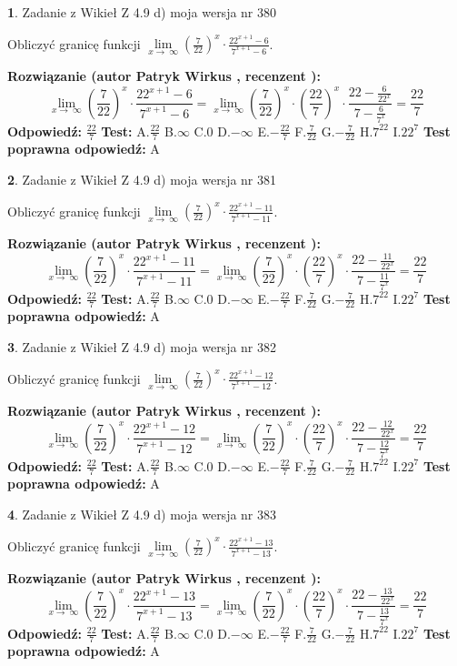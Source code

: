 \documentclass[12pt, a4paper]{article}
\theoremstyle{definition} %
\newtheorem{zad}{}
\newcommand{\zadStart}[1]{\begin{zad}#1\newline}
\newcommand{\zadStop}{\end{zad}}
\newcommand{\rozwStart}[2]{\noindent \textbf{Rozwiązanie (autor #1 , recenzent #2): }\newline}
\newcommand{\rozwStop}{\newline}
\newcommand{\odpStart}{\noindent \textbf{Odpowiedź:}\newline}
\newcommand{\odpStop}{\newline}
\newcommand{\testStart}{\noindent \textbf{Test:}\newline}
\newcommand{\testStop}{\newline}
\newcommand{\kluczStart}{\noindent \textbf{Test poprawna odpowiedź:}\newline}
\newcommand{\kluczStop}{\newline}
\begin{document}
\zadStart{Zadanie z Wikieł Z 4.9 d) moja wersja nr 380}


Obliczyć granicę funkcji  $\lim\limits_{x\to\ \infty}(\frac{7}{22})^{x}\cdot\frac{22^{x+1}-6}{7^{x+1}-6}$.
\zadStop
\rozwStart{Patryk Wirkus}{}
$$\lim\limits_{x\to\ \infty}(\frac{7}{22})^{x}\cdot\frac{22^{x+1}-6}{7^{x+1}-6}=\lim\limits_{x\to\ \infty}(\frac{7}{22})^{x}\cdot(\frac{22}{7})^{x} \cdot \frac{22-\frac{6}{22^{x}}}{7-\frac{6}{7^{x}}} = \frac{22}{7}$$
\rozwStop
\odpStart
$\frac{22}{7}$
\odpStop
\testStart
A.$\frac{22}{7}$ B.$\infty$ C.$0$ D.$-\infty$ E.$-\frac{22}{7}$
F.$\frac{7}{22}$ G.$-\frac{7}{22}$
H.$7^{22}$
I.$22^{7}$
\testStop
\kluczStart
A
\kluczStop



\zadStart{Zadanie z Wikieł Z 4.9 d) moja wersja nr 381}


Obliczyć granicę funkcji  $\lim\limits_{x\to\ \infty}(\frac{7}{22})^{x}\cdot\frac{22^{x+1}-11}{7^{x+1}-11}$.
\zadStop
\rozwStart{Patryk Wirkus}{}
$$\lim\limits_{x\to\ \infty}(\frac{7}{22})^{x}\cdot\frac{22^{x+1}-11}{7^{x+1}-11}=\lim\limits_{x\to\ \infty}(\frac{7}{22})^{x}\cdot(\frac{22}{7})^{x} \cdot \frac{22-\frac{11}{22^{x}}}{7-\frac{11}{7^{x}}} = \frac{22}{7}$$
\rozwStop
\odpStart
$\frac{22}{7}$
\odpStop
\testStart
A.$\frac{22}{7}$ B.$\infty$ C.$0$ D.$-\infty$ E.$-\frac{22}{7}$
F.$\frac{7}{22}$ G.$-\frac{7}{22}$
H.$7^{22}$
I.$22^{7}$
\testStop
\kluczStart
A
\kluczStop



\zadStart{Zadanie z Wikieł Z 4.9 d) moja wersja nr 382}


Obliczyć granicę funkcji  $\lim\limits_{x\to\ \infty}(\frac{7}{22})^{x}\cdot\frac{22^{x+1}-12}{7^{x+1}-12}$.
\zadStop
\rozwStart{Patryk Wirkus}{}
$$\lim\limits_{x\to\ \infty}(\frac{7}{22})^{x}\cdot\frac{22^{x+1}-12}{7^{x+1}-12}=\lim\limits_{x\to\ \infty}(\frac{7}{22})^{x}\cdot(\frac{22}{7})^{x} \cdot \frac{22-\frac{12}{22^{x}}}{7-\frac{12}{7^{x}}} = \frac{22}{7}$$
\rozwStop
\odpStart
$\frac{22}{7}$
\odpStop
\testStart
A.$\frac{22}{7}$ B.$\infty$ C.$0$ D.$-\infty$ E.$-\frac{22}{7}$
F.$\frac{7}{22}$ G.$-\frac{7}{22}$
H.$7^{22}$
I.$22^{7}$
\testStop
\kluczStart
A
\kluczStop



\zadStart{Zadanie z Wikieł Z 4.9 d) moja wersja nr 383}


Obliczyć granicę funkcji  $\lim\limits_{x\to\ \infty}(\frac{7}{22})^{x}\cdot\frac{22^{x+1}-13}{7^{x+1}-13}$.
\zadStop
\rozwStart{Patryk Wirkus}{}
$$\lim\limits_{x\to\ \infty}(\frac{7}{22})^{x}\cdot\frac{22^{x+1}-13}{7^{x+1}-13}=\lim\limits_{x\to\ \infty}(\frac{7}{22})^{x}\cdot(\frac{22}{7})^{x} \cdot \frac{22-\frac{13}{22^{x}}}{7-\frac{13}{7^{x}}} = \frac{22}{7}$$
\rozwStop
\odpStart
$\frac{22}{7}$
\odpStop
\testStart
A.$\frac{22}{7}$ B.$\infty$ C.$0$ D.$-\infty$ E.$-\frac{22}{7}$
F.$\frac{7}{22}$ G.$-\frac{7}{22}$
H.$7^{22}$
I.$22^{7}$
\testStop
\kluczStart
A
\kluczStop
\end{document}
